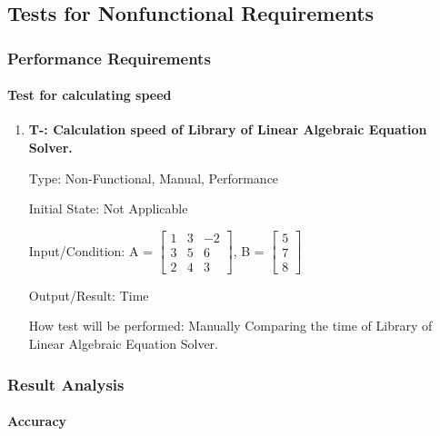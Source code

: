 \documentclass[12pt, titlepage]{article}
\newcounter{tnum}
\begin{document}
\subsection{Tests for Nonfunctional Requirements}

\subsubsection{Performance Requirements}
		
\paragraph{Test for calculating speed}

\begin{enumerate}

\item{\textbf{T-\thetnum \label{t-speed}: Calculation speed of  Library of Linear Algebraic Equation Solver.}}


Type: Non-Functional, Manual, Performance
					
Initial State: Not Applicable
					
Input/Condition: A = $\begin{bmatrix} 
1 & 3 & -2 \\
3 & 5 & 6\\
2 & 4 & 3
\end{bmatrix}$, B = $\begin{bmatrix} 
5\\
7\\
8 
\end{bmatrix}$
					
Output/Result: Time
					
How test will be performed: Manually Comparing the time of Library of Linear Algebraic Equation Solver.
					


\end{enumerate}

\subsubsection{Result Analysis}

\paragraph{Accuracy}
\end{document}
